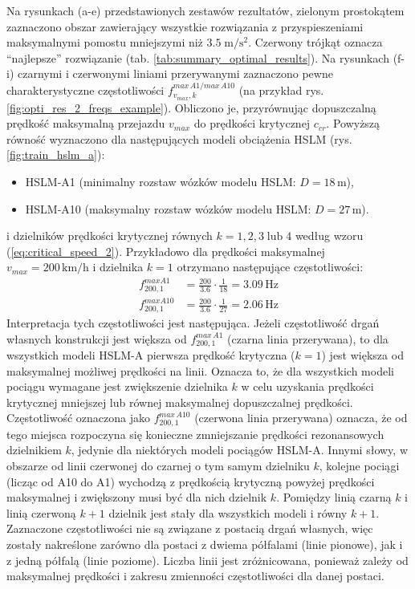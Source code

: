 Na rysunkach (a-e) przedstawionych zestawów rezultatów, zielonym prostokątem zaznaczono obszar zawierający wszystkie rozwiązania z przyspieszeniami maksymalnymi pomostu mniejszymi niż $3.5\;\mathrm{m/s^2}$. Czerwony trójkąt oznacza \enquote{najlepsze} rozwiązanie (tab. \ref{tab:summary_optimal_results}). Na rysunkach (f-i) czarnymi i czerwonymi liniami przerywanymi zaznaczono pewne charakterystyczne częstotliwości $f_{v_{max},k}^{max\,A1/max\,A10}$ (na przykład rys. \ref{fig:opti_res_2_freqs_example}). Obliczono je, przyrównując dopuszczalną prędkość maksymalną przejazdu $v_{max}$ do prędkości krytycznej $c_{cr}$. Powyższą równość wyznaczono dla następujących modeli obciążenia HSLM (rys. \ref{fig:train_hslm_a}):
\begin{itemize}
	\item HSLM-A1 (minimalny rozstaw wózków modelu HSLM: $D=18\,\mathrm{m}$),
	\item HSLM-A10 (maksymalny rozstaw wózków modelu HSLM: $D=27\,\mathrm{m}$).
\end{itemize}  
i dzielników prędkości krytycznej równych $k = 1, 2, 3\;\mathrm{lub}\;4$ według wzoru (\ref{eq:critical_speed_2}). Przykładowo dla prędkości maksymalnej $v_{max}=200\,\mathrm{km/h}$ i dzielnika $k=1$ otrzymano następujące częstotliwości:
\begin{equation*}
	\begin{split}
	f_{200,1}^{max A1} &= \frac{200}{3.6} \cdot \frac{1}{18}=3.09\,\mathrm{Hz} \\
	f_{200,1}^{max A10} &= \frac{200}{3.6} \cdot \frac{1}{27}=2.06\,\mathrm{Hz}
	\end{split}
\end{equation*} 
Interpretacja tych częstotliwości jest następująca. Jeżeli częstotliwość drgań własnych konstrukcji jest większa od $f_{200,1}^{max\,A1}$ (czarna linia przerywana), to dla wszystkich modeli HSLM-A pierwsza prędkość krytyczna ($k=1$) jest większa od maksymalnej możliwej prędkości na linii. Oznacza to, że dla wszystkich modeli pociągu wymagane jest zwiększenie dzielnika $k$ w celu uzyskania prędkości krytycznej mniejszej lub równej maksymalnej dopuszczalnej prędkości. Częstotliwość oznaczona jako $f_{200,1}^{max\,A10}$ (czerwona linia przerywana) oznacza, że od tego miejsca rozpoczyna się konieczne zmniejszanie prędkości rezonansowych dzielnikiem $k$, jedynie dla niektórych modeli pociągów HSLM-A. Innymi słowy, w obszarze od linii czerwonej do czarnej o tym samym dzielniku $k$, kolejne pociągi (licząc od A10 do A1) wychodzą z prędkością krytyczną powyżej prędkości maksymalnej i zwiększony musi być dla nich dzielnik $k$. Pomiędzy linią czarną $k$ i linią czerwoną $k+1$ dzielnik jest stały dla wszystkich modeli i równy $k+1$. Zaznaczone częstotliwości nie są związane z postacią drgań własnych, więc zostały nakreślone zarówno dla postaci z dwiema półfalami (linie pionowe), jak i z jedną półfalą (linie poziome). Liczba linii jest zróżnicowana, ponieważ zależy od maksymalnej prędkości i zakresu zmienności częstotliwości dla danej postaci. 

